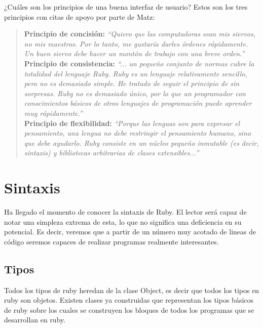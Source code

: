 \documentclass{article}
\begin{document}
\bigskip
¿Cuáles son los principios de una buena interfaz de usuario? Estos son los tres principios con citas de apoyo por parte de Matz:\\

\begin{quotation}
\noindent \textbf{Principio de concisión:} \textit{``Quiero que las computadoras sean mis siervos, no mis maestros. Por lo tanto, me gustaría darles órdenes rápidamente. Un buen siervo debe hacer un montón de trabajo con una breve orden.''}\\

\noindent \textbf{Principio de consistencia:} \textit{``... un pequeño conjunto de normas cubre la totalidad del lenguaje Ruby. Ruby es un lenguaje relativamente sencillo, pero no es demasiado simple. He tratado de seguir el principio de \textit{sin sorpresas}. Ruby no es demasiado único, por lo que un programador con conocimientos básicos de otros lenguajes de programación puede aprender muy rápidamente.''}\\

\noindent \textbf{Principio de flexibilidad:} \textit{``Porque las lenguas son para expresar el pensamiento, una lengua no debe restringir el pensamiento humano, sino que debe ayudarlo. Ruby consiste en un núcleo pequeño inmutable (es decir, sintaxis) y bibliotecas arbitrarias de clases extensibles...''}
\end{quotation}




\section{Sintaxis}

	Ha llegado el momento de conocer la sintaxis de Ruby. El lector será capaz de notar una simpleza extrema de esta, lo que no significa una deficiencia en su potencial. Es decir, veremos que a partir de un número muy acotado de lineas de código seremos capaces de realizar programas realmente interesantes.

\subsection{Tipos}
Todos los tipos de ruby heredan de la clase Object, es decir que todos los tipos en ruby son objetos. Existen clases ya construidas que representan los tipos básicos de ruby sobre los cuales se construyen los bloques de todos los programas que se desarrollan en ruby.
\end{document}
